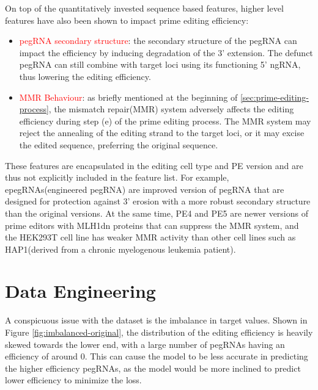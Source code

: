 On top of the quantitatively invested sequence based features, higher level features have also been shown to impact prime editing efficiency:
\begin{itemize}[itemsep=-0mm]
    \item \textcolor{red}{pegRNA secondary structure}: the secondary structure of the pegRNA can impact the efficiency by inducing degradation of the 3' extension. The defunct pegRNA can still combine with target loci using its functioning 5' ngRNA, thus lowering the editing efficiency\cite{nelsonEngineeredPegRNAsImprove2022}.
    \item \textcolor{red}{MMR Behaviour}: as briefly mentioned at the beginning of \autoref{sec:prime-editing-process}, the mismatch repair(MMR) system adversely affects the editing efficiency during step (e) of the prime editing process. The MMR system may reject the annealing of the editing strand to the target loci, or it may excise the edited sequence, preferring the original sequence\cite{chenEnhancedPrimeEditing2021}. 
\end{itemize}

These features are encapsulated in the editing cell type and PE version and are thus not explicitly included in the feature list. For example, epegRNAs(engineered pegRNA) are improved version of pegRNA that are designed for protection against 3' erosion with a more robust secondary structure than the original versions\cite{nelsonEngineeredPegRNAsImprove2022}. At the same time, PE4 and PE5 are newer versions of prime editors with MLH1dn proteins that can suppress the MMR system\cite{chenEnhancedPrimeEditing2021}, and the HEK293T cell line has weaker MMR activity than other cell lines such
as HAP1(derived from a chronic myelogenous leukemia patient)\cite{mathisPredictingPrimeEditing2023}. 

\section{Data Engineering}
\label{sec:data-engineering}

A conspicuous issue with the dataset is the imbalance in target values. Shown in Figure \ref{fig:imbalanced-original}, the distribution of the editing efficiency is heavily skewed towards the lower end, with a large number of pegRNAs having an efficiency of around 0. This can cause the model to be less accurate in predicting the higher efficiency pegRNAs, as the model would be more inclined to predict lower efficiency to minimize the loss. 

